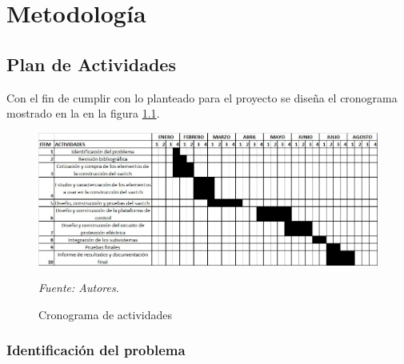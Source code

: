 
\chapter{Metodología}
\section{Plan de Actividades}

Con el fin de cumplir con lo planteado para el proyecto se diseña el cronograma mostrado en la en la figura \ref{fig:Crono}.

\begin{figure}[ht!]
\begin{centering}
\includegraphics [trim = 0mm 0mm 0mm 0mm, clip,angle=0,scale=0.50]{Images/Crono}%
\caption{\label{fig:Crono}Cronograma de actividades}
\textit{Fuente: Autores}. 
\par\end{centering}
\end{figure}



\subsection{Identificación del problema}

